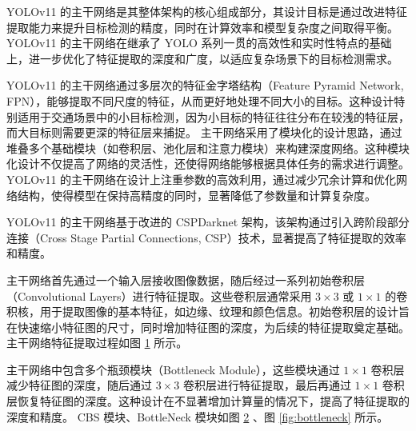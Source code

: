YOLOv11 的主干网络是其整体架构的核心组成部分，其设计目标是通过改进特征提取能力来提升目标检测的精度，同时在计算效率和模型复杂度之间取得平衡。YOLOv11 的主干网络在继承了 YOLO 系列一贯的高效性和实时性特点的基础上，进一步优化了特征提取的深度和广度，以适应复杂场景下的目标检测需求。

YOLOv11 的主干网络通过多层次的特征金字塔结构（Feature Pyramid Network, FPN）\cite{fpn}，能够提取不同尺度的特征，从而更好地处理不同大小的目标。这种设计特别适用于交通场景中的小目标检测，因为小目标的特征往往分布在较浅的特征层，而大目标则需要更深的特征层来捕捉。
主干网络采用了模块化的设计思路，通过堆叠多个基础模块（如卷积层、池化层和注意力模块）来构建深度网络。这种模块化设计不仅提高了网络的灵活性，还使得网络能够根据具体任务的需求进行调整。
YOLOv11 的主干网络在设计上注重参数的高效利用，通过减少冗余计算和优化网络结构，使得模型在保持高精度的同时，显著降低了参数量和计算复杂度。

YOLOv11 的主干网络基于改进的 CSPDarknet 架构\cite{csp}，该架构通过引入跨阶段部分连接（Cross Stage Partial Connections, CSP）技术，显著提高了特征提取的效率和精度。

主干网络首先通过一个输入层接收图像数据，随后经过一系列初始卷积层（Convolutional Layers）进行特征提取。这些卷积层通常采用 $3\times3$ 或 $1\times1$ 的卷积核，用于提取图像的基本特征，如边缘、纹理和颜色信息。初始卷积层的设计旨在快速缩小特征图的尺寸，同时增加特征图的深度，为后续的特征提取奠定基础。
主干网络特征提取过程如图 \ref{fig:YOLOv11_BackBone_input} 所示。
\begin{figure}[htb]
    \centering
    \captionsetup{font=footnotesize}
    \label{fig:YOLOv11_BackBone_input}
\end{figure}

主干网络中包含多个瓶颈模块（Bottleneck Module），这些模块通过 $1\times1$ 卷积层减少特征图的深度，随后通过 $3\times3$ 卷积层进行特征提取，最后再通过 $1\times1$ 卷积层恢复特征图的深度。这种设计在不显著增加计算量的情况下，提高了特征提取的深度和精度。
CBS 模块、BottleNeck 模块如图 \ref{fig:cbs} 、图 \ref{fig:bottleneck} 所示。
\begin{figure}[htb]
    \centering
    \captionsetup{font=footnotesize}
    \label{fig:cbs}
\end{figure}

